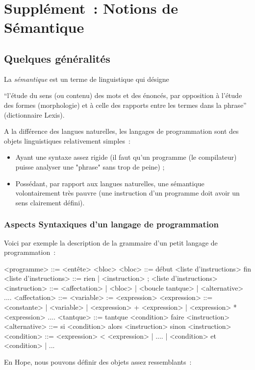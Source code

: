 
\chapter{Supplément~: Notions de Sémantique}





\section{Quelques généralités}


La \emph{sémantique} est 
un terme de linguistique qui désigne 
\begin{citation}``l'étude du 
sens (ou contenu) des mots et des énoncés, par opposition à l'étude
des formes (morphologie) et à celle des rapports entre les termes dans
la phrase'' (dictionnaire Lexis).
\end{citation}

A la différence des langues naturelles, les langages de programmation
sont des objets linguistiques relativement simples~:

\begin{itemize}
\item Ayant une syntaxe assez rigide (il faut qu'un programme (le
compilateur) puisse analyser une "phrase" sans trop de peine) ;
\item Possédant, par rapport aux langues naturelles, une sémantique
volontairement très pauvre (une instruction d'un programme doit avoir
un sens clairement défini).
\end{itemize}

\subsection{Aspects Syntaxiques d'un langage de programmation}

Voici par exemple la description de la grammaire d'un petit langage de
programmation~:

\begin{verbatimtab}
<programme>    ::= <entête> <bloc>
<bloc>         ::= début <liste d'instructions> fin
<liste d'instructions> 
               ::=   rien
                 |   <instruction> ; <liste d'instructions>
<instruction>  ::= <affectation>
                 |   <bloc>
                 |   <boucle tantque>
                 |   <alternative>
                      ....
<affectation>  ::= <variable> := <expression>
<expression>   ::= <constante>
                 |   <variable>
                 |   <expression> + <expression>
                 |   <expression> * <expression>
                      ....
<tantque>      ::= tantque <condition> faire <instruction>
<alternative>  ::= si <condition> alors <instruction> sinon <instruction>
<condition>    ::= <expression>  <  <expression>
                 |  ....
                 |  <condition> et <condition>
                 | ...
\end{verbatimtab}
En Hope, nous pouvons définir des objets assez ressemblants~:

